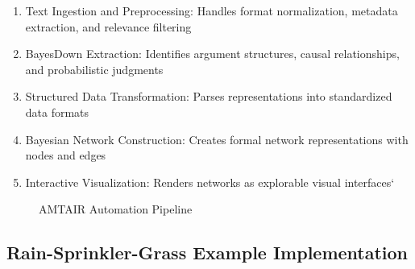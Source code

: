 \documentclass[12pt,a4paper]{report}
\providecommand{\tightlist}{%
  \setlength{\itemsep}{0pt}\setlength{\parskip}{0pt}}
\begin{document}
\begin{enumerate}
\def\labelenumi{\arabic{enumi}.}
\tightlist
\item
  Text Ingestion and Preprocessing: Handles format normalization,
  metadata extraction, and relevance filtering
\item
  BayesDown Extraction: Identifies argument structures, causal
  relationships, and probabilistic judgments
\item
  Structured Data Transformation: Parses representations into
  standardized data formats
\item
  Bayesian Network Construction: Creates formal network representations
  with nodes and edges
\item
  Interactive Visualization: Renders networks as explorable visual
  interfaces`
\end{enumerate}

\begin{figure}


\caption[Five-step AMTAIR automation pipeline from PDFs to Bayesian
networks]{\label{fig-automation_pipeline}AMTAIR Automation Pipeline}

\end{figure}%

\subsection{Rain-Sprinkler-Grass Example
Implementation}\label{sec-rain-sprinkler-grass}
\end{document}
